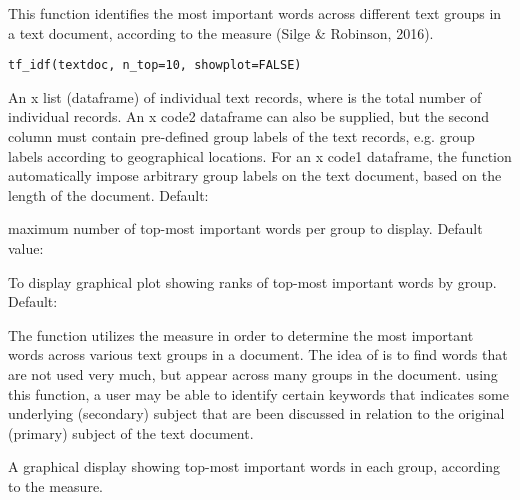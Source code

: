 \documentclass[a4paper]{book}
\begin{document}
%
\begin{Description}\relax
This function identifies the most
important words across different text groups in a text document,
according to the  measure (Silge \& Robinson, 2016).
\end{Description}
%
\begin{Usage}
\begin{verbatim}
tf_idf(textdoc, n_top=10, showplot=FALSE)
\end{verbatim}
\end{Usage}
%
\begin{Arguments}
\begin{ldescription}
\item[\code{textdoc}] An  x  list (dataframe) of
individual text records, where  is the total
number of individual records. An  x code2 dataframe can
also be supplied, but the second column must contain
pre-defined group labels of the text records, e.g. group labels
according to geographical locations.
For an  x code1 dataframe, the function
automatically impose arbitrary group labels on
the text document, based on the length  of the document.
Default: 

\item[\code{n\_top}]  maximum number of top-most important words
per group to display. Default value: 

\item[\code{showplot}] To display graphical plot showing
ranks of top-most important words by group.
Default: 
\end{ldescription}
\end{Arguments}
%
\begin{Details}\relax
The function utilizes the  measure
in order to determine the most important words across various
text groups in a document. The idea of  is
to find words that are not used very much, but appear across
many groups in the document. using this function, a user
may be able to identify certain keywords that indicates some
underlying (secondary) subject that are been discussed
in relation to the original (primary) subject of the text
document.
\end{Details}
%
\begin{Value}
A graphical display showing top-most important
words in each group, according to the 
measure.
\end{Value}
\end{document}
